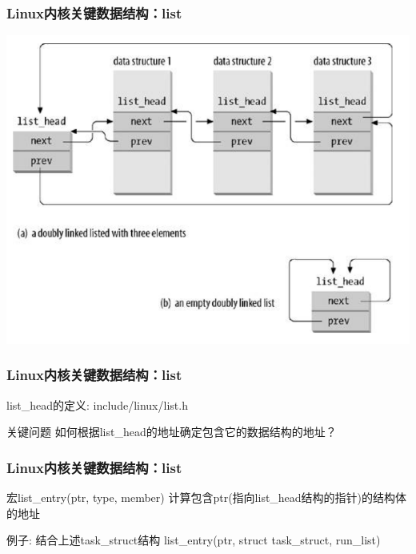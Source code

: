 \documentclass[xcolor=svgnames]{beamer}
\begin{document}
\begin{CJK*}{UTF8}{gbsn}

\begin{frame}[fragile]%
\frametitle{Linux内核关键数据结构：list}
\includegraphics[width=1.0\textwidth]{listhead.png}
\end{frame}

\begin{frame}[fragile]%
\frametitle{Linux内核关键数据结构：list}
\begin{block}{list\_head的定义: include/linux/list.h}
\lstlisthead
\end{block}
\begin{block}{关键问题}
如何根据list\_head的地址确定包含它的数据结构的地址？
\end{block}
\end{frame}

\begin{frame}[fragile]%
\frametitle{Linux内核关键数据结构：list}
\begin{block}{宏list\_entry(ptr, type, member)}
计算包含ptr(指向list\_head结构的指针)的结构体的地址
\end{block}
\begin{block}{例子: 结合上述task\_struct结构}
list\_entry(ptr, struct task\_struct, run\_list)
\end{block}


\end{frame}
\end{CJK*}
\end{document}
